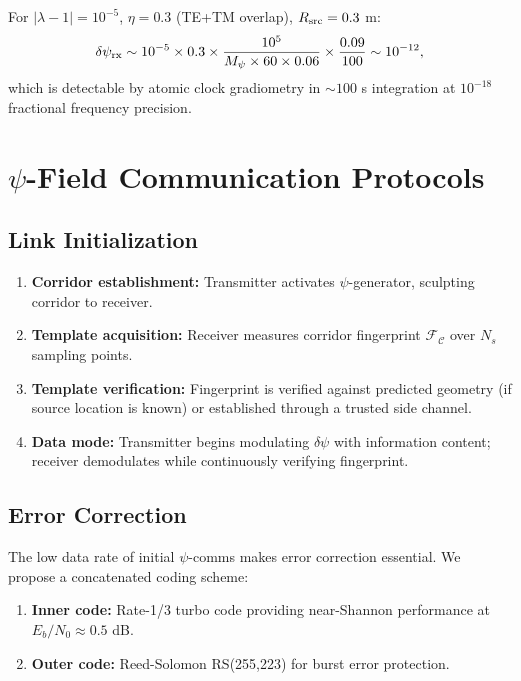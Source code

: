 \documentclass[twocolumn,superscriptaddress,prd,nofootinbib]{revtex4-2}
\newcommand{\Corridor}{\mathcal{C}}
\newcommand{\Fingerprint}{\mathcal{F}}
\begin{document}
For $|\lambda - 1| = 10^{-5}$, $\eta = 0.3$ (TE+TM overlap),
$R_{\rm src} = 0.3$ m:
\begin{equation}
\delta\psi_{\rm rx} \sim 10^{-5} \times 0.3 \times
\frac{10^5}{M_\psi \times 60 \times 0.06} \times \frac{0.09}{100}
\sim 10^{-12},
\label{eq:rx-field}
\end{equation}
which is detectable by atomic clock gradiometry in $\sim 100$ s
integration at $10^{-18}$ fractional frequency precision.

\section{$\psi$-Field Communication Protocols}\label{sec:protocols}

\subsection{Link Initialization}

\begin{enumerate}
\item \textbf{Corridor establishment:} Transmitter activates
$\psi$-generator, sculpting corridor to receiver.
\item \textbf{Template acquisition:} Receiver measures corridor
fingerprint $\Fingerprint_\Corridor$ over $N_s$ sampling points.
\item \textbf{Template verification:} Fingerprint is verified against
predicted geometry (if source location is known) or established through
a trusted side channel.
\item \textbf{Data mode:} Transmitter begins modulating $\delta\psi$
with information content; receiver demodulates while continuously
verifying fingerprint.
\end{enumerate}

\subsection{Error Correction}

The low data rate of initial $\psi$-comms makes error correction
essential.
We propose a concatenated coding scheme:
\begin{enumerate}
\item \textbf{Inner code:} Rate-1/3 turbo code providing near-Shannon
performance at $E_b/N_0 \approx 0.5$ dB.
\item \textbf{Outer code:} Reed-Solomon RS(255,223) for burst error
protection.
\end{enumerate}
\end{document}
